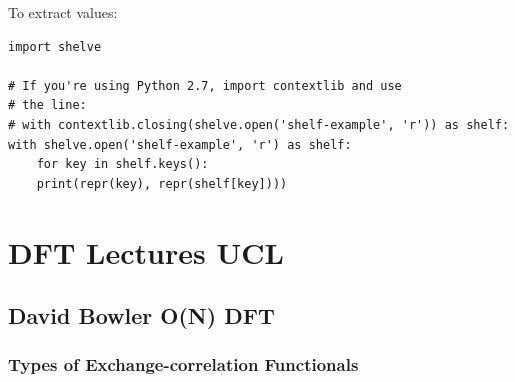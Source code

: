 \documentclass[11pt]{article}
\begin{document}
To extract values:
\begin{verbatim}
import shelve

# If you're using Python 2.7, import contextlib and use
# the line:
# with contextlib.closing(shelve.open('shelf-example', 'r')) as shelf:
with shelve.open('shelf-example', 'r') as shelf:
    for key in shelf.keys():
	print(repr(key), repr(shelf[key])))
\end{verbatim}

\section{DFT Lectures UCL}
\label{sec:org764e3ba}
\subsection{David Bowler O(N) DFT}
\label{sec:orge2e04b1}
\subsubsection{Types of Exchange-correlation Functionals}
\label{sec:org520ba16}
\end{document}
